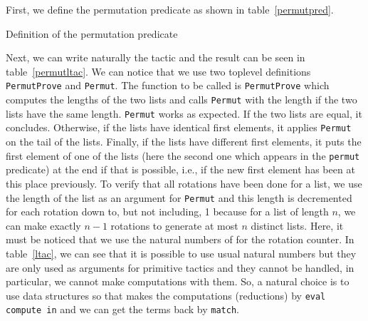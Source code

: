 First, we define the permutation predicate as shown in table~\ref{permutpred}.

\begin{table}[ht]
\noindent{}
\caption{Definition of the permutation predicate}
\label{permutpred}
\end{table}

Next, we can write naturally the tactic and the result can be seen in
table~\ref{permutltac}. We can notice that we use two toplevel definitions {\tt
PermutProve} and {\tt Permut}. The function to be called is {\tt PermutProve}
which computes the lengths of the two lists and calls {\tt Permut} with the
length if the two lists have the same length. {\tt Permut} works as expected.
If the two lists are equal, it concludes. Otherwise, if the lists have
identical first elements, it applies {\tt Permut} on the tail of the lists.
Finally, if the lists have different first elements, it puts the first element
of one of the lists (here the second one which appears in the {\tt permut}
predicate) at the end if that is possible, i.e., if the new first element has
been at this place previously. To verify that all rotations have been done for
a list, we use the length of the list as an argument for {\tt Permut} and this
length is decremented for each rotation down to, but not including, 1 because
for a list of length $n$, we can make exactly $n-1$ rotations to generate at
most $n$ distinct lists. Here, it must be noticed that we use the natural
numbers of {\Coq} for the rotation counter. In table~\ref{ltac}, we can see
that it is possible to use usual natural numbers but they are only used as
arguments for primitive tactics and they cannot be handled, in particular, we
cannot make computations with them. So, a natural choice is to use {\Coq} data
structures so that {\Coq} makes the computations (reductions) by {\tt eval
compute in} and we can get the terms back by {\tt match}.
 
